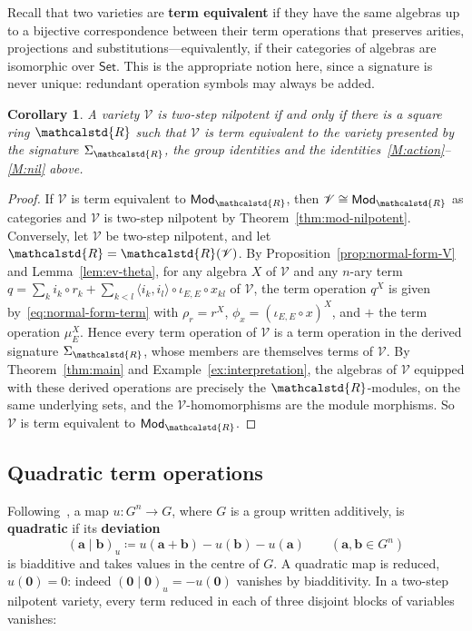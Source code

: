 \documentclass[reqno,a4paper]{amsart}
\theoremstyle{plain}
\newtheorem{corollary}[subsection]{Corollary}
\theoremstyle{definition}
\newcommand{\defn}{\textbf}
\newcommand{\DefEq}{\coloneq}
\newcommand{\V}{\ensuremath{\mathcal{V}}}
\newcommand{\R}{\ensuremath{\mathcalstd{R}}}
\newcommand{\Set}{\ensuremath{\mathsf{Set}}}
\newcommand{\Mod}{\ensuremath{\mathsf{Mod}}}
\begin{document}
Recall that two varieties are \defn{term equivalent} if they have the same algebras up to a bijective correspondence between their term operations that preserves arities, projections and substitutions---equivalently, if their categories of algebras are isomorphic over \(\Set\). This is the appropriate notion here, since a signature is never unique: redundant operation symbols may always be added.

\begin{corollary}\label{cor:term-equivalence}
  A variety \(\V\) is two-step nilpotent if and only if there is a square ring \(\R\) such that \(\V\) is term equivalent to the variety presented by the signature \(\Sigma_{\R}\), the group identities and the identities~\ref{M:action}--\ref{M:nil} above.
\end{corollary}

\begin{proof}
  If \(\V\) is term equivalent to \(\Mod_{\R}\), then \(\V\cong\Mod_{\R}\) as categories and \(\V\) is two-step nilpotent by Theorem~\ref{thm:mod-nilpotent}. Conversely, let \(\V\) be two-step nilpotent, and let \(\R=\R(\V)\). By Proposition~\ref{prop:normal-form-V} and Lemma~\ref{lem:ev-theta}, for any algebra \(X\) of \(\V\) and any \(n\)-ary term \(q=\sum_{k}i_{k}\circ r_{k}+\sum_{k<l}\langle i_{k},i_{l}\rangle\circ\iota_{E,E}\circ x_{kl}\) of \(\V\), the term operation \(q^{X}\) is given by~\eqref{eq:normal-form-term} with \(\rho_{r}=r^{X}\), \(\phi_{x}=(\iota_{E,E}\circ x)^{X}\), and \(+\) the term operation \(\mu_{E}^{X}\). Hence every term operation of \(\V\) is a term operation in the derived signature \(\Sigma_{\R}\), whose members are themselves terms of \(\V\). By Theorem~\ref{thm:main} and Example~\ref{ex:interpretation}, the algebras of \(\V\) equipped with these derived operations are precisely the \(\R\)-modules, on the same underlying sets, and the \(\V\)-homomorphisms are the module morphisms. So \(\V\) is term equivalent to \(\Mod_{\R}\).
\end{proof}

\subsection{Quadratic term operations}\label{sec:quadratic-terms}
Following~\cite{BHP}, a map \(u\colon G^{n}\to G\), where \(G\) is a group written additively, is \defn{quadratic} if its \defn{deviation}
\[
  (\mathbf{a}\mid\mathbf{b})_{u}\DefEq u(\mathbf{a}+\mathbf{b})-u(\mathbf{b})-u(\mathbf{a})\qquad(\mathbf{a},\mathbf{b}\in G^{n})
\]
is biadditive and takes values in the centre of \(G\). A quadratic map is reduced, \(u(\mathbf{0})=0\): indeed \((\mathbf{0}\mid\mathbf{0})_{u}=-u(\mathbf{0})\) vanishes by biadditivity. In a two-step nilpotent variety, every term reduced in each of three disjoint blocks of variables vanishes:
\end{document}
